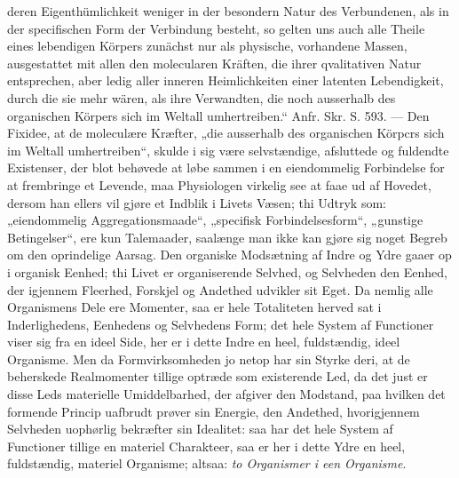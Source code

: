 \documentclass[12pt,a4paper]{book}
\begin{document}
{deren Eigenthümlichkeit weniger in der besondern Natur des Verbundenen,
als in der specifischen Form der Verbindung besteht, so gelten uns auch
alle Theile eines lebendigen Körpers zunächst nur als physische,
vorhandene
Massen, ausgestattet mit allen den molecularen Kräften, die ihrer
qvalitativen Natur entsprechen, aber ledig aller inneren Heimlichkeiten
einer latenten Lebendigkeit, durch die sie mehr wären, als ihre
Verwandten, die noch ausserhalb des organischen Körpers sich im Weltall
umhertreiben.“ Anfr. Skr. S. 593. --- Den Fixidee, at de moleculære
Kræfter, „die ausserhalb des organischen Körpcrs sich im Weltall
umhertreiben“, skulde i sig være selvstændige, afsluttede og fuldendte
Existenser, der blot behøvede at løbe sammen i en eiendommelig
Forbindelse for at frembringe et Levende, maa Physiologen virkelig see
at faae ud af Hovedet, dersom han ellers vil gjøre et Indblik i Livets
Væsen; thi Udtryk som: „eiendommelig Aggregationsmaade“, „specifisk
Forbindelsesform“, „gunstige Betingelser“, ere kun Talemaader, saalænge
man ikke kan gjøre sig noget Begreb om den oprindelige Aarsag.}
Den organiske Modsætning af Indre og Ydre gaaer op i organisk Eenhed;
thi Livet er organiserende Selvhed,
og Selvheden den Eenhed, der igjennem Fleerhed, Forskjel og Andethed
udvikler sit Eget. Da nemlig alle Organismens Dele ere Momenter, saa er
hele Totaliteten herved sat i Inderlighedens, Eenhedens og Selvhedens
Form; det hele System af Functioner viser sig fra en ideel Side, her er
i dette Indre en heel, fuldstændig, ideel Organisme. Men da
Formvirksomheden jo netop har sin Styrke deri, at de beherskede
Realmomenter tillige optræde som existerende Led, da det just er disse
Leds materielle Umiddelbarhed, der afgiver den Modstand, paa hvilken det
formende Princip uafbrudt prøver sin Energie, den Andethed, hvorigjennem
Selvheden uophørlig bekræfter sin Idealitet: saa har det hele System af
Functioner tillige en materiel Charakteer, saa er her i dette Ydre en
heel, fuldstændig, materiel Organisme; altsaa: \emph{to Organismer i een
Organisme}.
\end{document}
